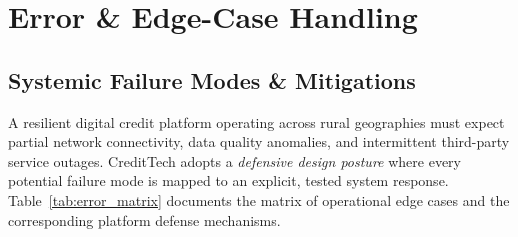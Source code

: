 \chapter{Error \& Edge-Case Handling}
\label{chap:error_handling}

\section{Systemic Failure Modes \& Mitigations}
A resilient digital credit platform operating across rural geographies must expect partial network connectivity, data quality anomalies, and intermittent third-party service outages. CreditTech adopts a \textit{defensive design posture} where every potential failure mode is mapped to an explicit, tested system response. Table~\ref{tab:error_matrix} documents the matrix of operational edge cases and the corresponding platform defense mechanisms.

